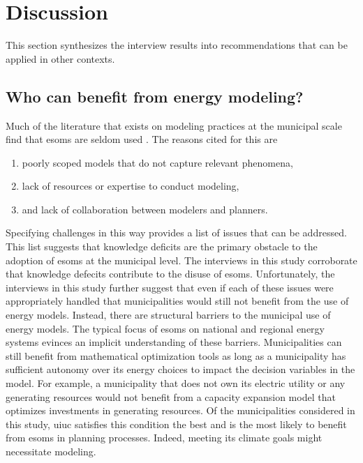 \section{Discussion}
\label{section:interview-discussion}
This section synthesizes the interview results into recommendations that can be
applied in other contexts.

\subsection{Who can benefit from energy modeling?}
Much of the literature that exists on modeling practices at the municipal scale
find that \acp{esom} are seldom used
\cite{ben_amer_too_2020,johannsen_municipal_2023}. The reasons cited for this
are \cite{ben_amer_too_2020,johannsen_municipal_2023,susser_better_2022}
\begin{enumerate}
    \item poorly scoped models that do not capture relevant phenomena,
    \item lack of resources or expertise to conduct modeling, 
    \item and lack of collaboration between modelers and planners.
\end{enumerate} 
Specifying challenges in this way provides a list of issues that can be
addressed. 
This list suggests that knowledge deficits are the primary obstacle to the adoption of \acp{esom} at the 
municipal level. The interviews in this study corroborate that knowledge defecits
contribute to the disuse of \acp{esom}.
Unfortunately, the interviews in this study further suggest that even if each
of these issues were appropriately handled that municipalities would still not
benefit from the use of energy models. Instead, there are structural barriers to
the municipal use of energy models. The typical focus of \acp{esom} on national
and regional energy systems evinces an implicit understanding of these barriers.
Municipalities can still benefit from mathematical optimization tools as long as
a municipality has sufficient autonomy over its energy choices to impact the
decision variables in the model. For example, a municipality that does not own
its electric utility or any generating resources would not benefit from a
capacity expansion model that optimizes investments in generating resources. Of
the municipalities considered in this study, \ac{uiuc} satisfies this condition
the best and is the most likely to benefit from \acp{esom} in planning
processes. Indeed, meeting its climate goals might necessitate modeling.


